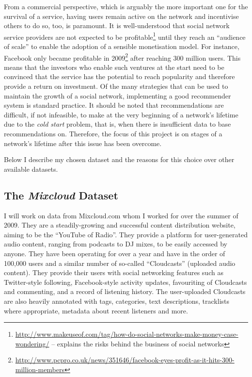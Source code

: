 From a commercial perspective, which is arguably the more important one for the survival of a service, having users remain active on the network and incentivise others to do so, too, is paramount. It is well-understood that social network service providers are not expected to be profitable\footnote{\url{http://www.makeuseof.com/tag/how-do-social-networks-make-money-case-wondering/} -- explains the risks behind the business of social networks} until they reach an ``audience of scale'' to enable the adoption of a sensible monetisation model. For instance, Facebook only became profitable in 2009\footnote{\url{http://www.pcpro.co.uk/news/351646/facebook-eyes-profit-as-it-hits-300-million-members}} after reaching 300 million users. This means that the investors who enable such ventures at the start need to be convinced that the service has the potential to reach popularity and therefore provide a return on investment. Of the many strategies that can be used to maintain the growth of a social network, implementing a good recommender system is standard practice. It should be noted that recommendations are difficult, if not infeasible, to make at the very beginning of a network's lifetime due to the \emph{cold start} problem, that is, when there is insufficient data to base recommendations on. Therefore, the focus of this project is on stages of a network's lifetime after this issue has been overcome.

Below I describe my chosen dataset and the reasons for this choice over other available datasets.

\subsection*{The \emph{Mixcloud} Dataset}

I will work on data from Mixcloud.com whom I worked for over the summer of 2009. They are a steadily-growing and successful content distribution website, aiming to be the ``YouTube of Radio''. They provide a platform for user-generated audio content, ranging from podcasts to DJ mixes, to be easily accessed by anyone. They have been operating for over a year and have in the order of 100,000 users and a similar number of so-called ``Cloudcasts'' (uploaded audio content). They provide their users with social networking features such as Twitter-style following, Facebook-style activity updates, favouriting of Cloudcasts and commenting, and a record of listening history. The user-uploaded Cloudcasts are also heavily annotated with tags, categories, text descriptions, tracklists where appropriate, metadata about recent listeners and more. 

